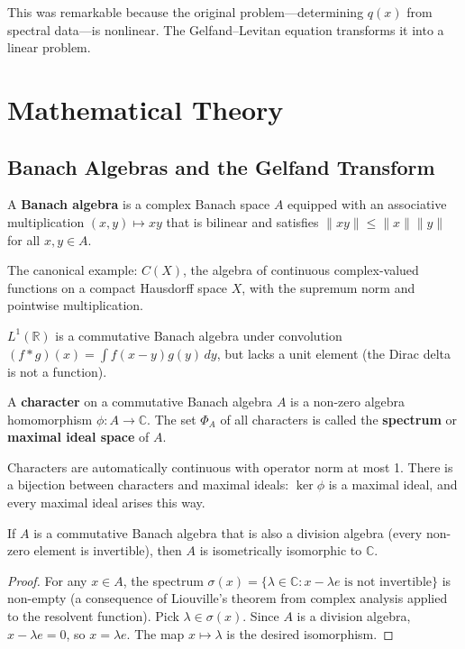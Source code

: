 This was remarkable because the original problem---determining $q(x)$ from spectral data---is nonlinear. The Gelfand--Levitan equation transforms it into a linear problem.

\section{Mathematical Theory}

\subsection{Banach Algebras and the Gelfand Transform}

\begin{definition}
A \textbf{Banach algebra} is a complex Banach space $A$ equipped with an associative multiplication $(x,y) \mapsto xy$ that is bilinear and satisfies $\|xy\| \leq \|x\|\|y\|$ for all $x,y \in A$.
\end{definition}

The canonical example: $C(X)$, the algebra of continuous complex-valued functions on a compact Hausdorff space $X$, with the supremum norm and pointwise multiplication.

\begin{example}
$L^1(\mathbb{R})$ is a commutative Banach algebra under convolution $(f*g)(x) = \int f(x-y)g(y)\,dy$, but lacks a unit element (the Dirac delta is not a function).
\end{example}

\begin{definition}[Character]
A \textbf{character} on a commutative Banach algebra $A$ is a non-zero algebra homomorphism $\phi: A \to \mathbb{C}$. The set $\Phi_A$ of all characters is called the \textbf{spectrum} or \textbf{maximal ideal space} of $A$.
\end{definition}

Characters are automatically continuous with operator norm at most 1. There is a bijection between characters and maximal ideals: $\ker \phi$ is a maximal ideal, and every maximal ideal arises this way.

\begin{theorem}
If $A$ is a commutative Banach algebra that is also a division algebra (every non-zero element is invertible), then $A$ is isometrically isomorphic to $\mathbb{C}$.
\end{theorem}

\begin{proof}
For any $x \in A$, the spectrum $\sigma(x) = \{\lambda \in \mathbb{C} : x - \lambda e \text{ is not invertible}\}$ is non-empty (a consequence of Liouville's theorem from complex analysis applied to the resolvent function). Pick $\lambda \in \sigma(x)$. Since $A$ is a division algebra, $x - \lambda e = 0$, so $x = \lambda e$. The map $x \mapsto \lambda$ is the desired isomorphism.
\end{proof}

